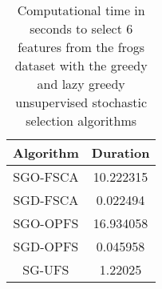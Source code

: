 \begin{table}
	\begin{center}
		\begin{tabular}{c c}
			Algorithm & Duration \\
			\hline
			SGO-FSCA & 10.222315 \\
			SGD-FSCA & 0.022494 \\
			SGO-OPFS & 16.934058 \\
			SGD-OPFS & 0.045958 \\
			SG-UFS & 1.22025 \\
		\end{tabular}
	\end{center}
	\caption{Computational time in seconds to select 6 features from the frogs dataset with the greedy and lazy greedy unsupervised stochastic selection algorithms}
\end{table}